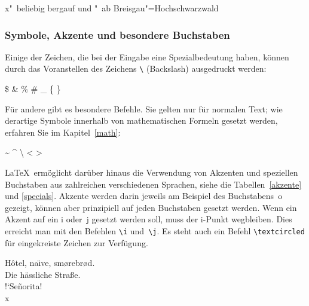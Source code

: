 \begin{LTXexample}[firstline=2]
\obeylines
x"~beliebig
bergauf und "~ab
Breisgau"=Hochschwarzwald
\end{LTXexample}


\subsubsection{Symbole, Akzente und besondere Buchstaben}\label{symbole}

Einige der Zeichen, die bei der Eingabe eine Spezialbedeutung haben,
können durch das Voranstellen des
Zeichens \lstinline|\| (Backslash) ausgedruckt werden:
\begin{LTXexample}
\$ \& \% \# \_ \{ \}
\end{LTXexample}
Für andere gibt es besondere Befehle.  Sie gelten nur für normalen
Text; wie derartige Symbole innerhalb von mathematischen
Formeln gesetzt werden, erfahren Sie im Kapitel~\ref{math}:
\begin{LTXexample}[firstline=2]
\obeylines
\textasciitilde
\textasciicircum
\textbackslash
\textbar
\textless
\textgreater
\end{LTXexample}

\LaTeX\ ermöglicht darüber hinaus die Verwendung von Akzenten
und speziellen Buchstaben aus zahlreichen verschiedenen Sprachen,
siehe die Tabellen~\ref{akzente}  und \ref{specials}.
Akzente werden darin jeweils am Beispiel
des Buchstabens~o gezeigt, können aber prinzipiell auf jeden
Buchstaben gesetzt werden.
Wenn ein Akzent auf ein i oder~j gesetzt werden soll, muss der
\mbox{i-Punkt} wegbleiben. Dies erreicht man mit den Befehlen
\lstinline|\i| und~\lstinline|\j|.
Es steht auch ein Befehl \lstinline|\textcircled| für
eingekreiste Zeichen zur Verfügung.

\begin{LTXexample}
H\^otel, na\"\i ve, sm\o rebr\o d. \\
Die h\"assliche Stra\ss{}e.\\
!`Se\~norita!\\
\textcircled{x}
\end{LTXexample}


